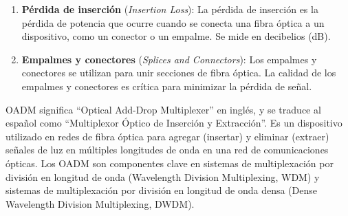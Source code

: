 \documentclass[
	12pt, %
	fleqn, %
	a4paper, %
	oneside, %
]{LegrandOrangeBook}
\begin{document}
\begin{enumerate}
\item \textbf{Pérdida de inserción} (\textit{Insertion Loss}): La pérdida de inserción es la pérdida de potencia que ocurre cuando se conecta una fibra óptica a un dispositivo, como un conector o un empalme. Se mide en decibelios (dB).

\item \textbf{Empalmes y conectores} (\textit{Splices and Connectors}): Los empalmes y conectores se utilizan para unir secciones de fibra óptica. La calidad de los empalmes y conectores es crítica para minimizar la pérdida de señal.
\end{enumerate}

\begin{vocabulary}[OADM]
OADM significa ``Optical Add-Drop Multiplexer'' en inglés, y se traduce al español como ``Multiplexor Óptico de Inserción y Extracción''. Es un dispositivo utilizado en redes de fibra óptica para agregar (insertar) y eliminar (extraer) señales de luz en múltiples longitudes de onda en una red de comunicaciones ópticas. Los OADM son componentes clave en sistemas de multiplexación por división en longitud de onda (Wavelength Division Multiplexing, WDM) y sistemas de multiplexación por división en longitud de onda densa (Dense Wavelength Division Multiplexing, DWDM).
\end{vocabulary}
\end{document}
